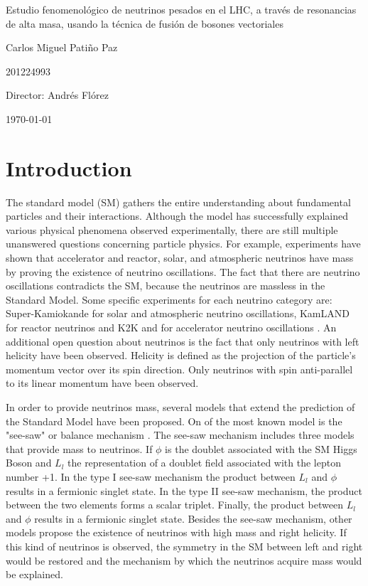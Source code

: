 \documentclass[12pt]{article}
\begin{document}
\begin{center}
\Huge
Estudio fenomenológico de neutrinos pesados en el LHC, a través de resonancias de alta masa, usando la técnica de fusión de bosones vectoriales 

\vspace{3mm}
\Large Carlos Miguel Patiño Paz

\large
201224993


\vspace{2mm}
\Large
Director: Andrés Flórez

\normalsize
\vspace{2mm}

\today
\end{center}


\normalsize
\section{Introduction}

The standard model (SM) gathers the entire understanding about fundamental particles and their interactions. Although the model has successfully explained various physical phenomena observed experimentally, there are still multiple unanswered questions concerning particle physics. For example, experiments \cite{Detectores} have shown that accelerator and reactor, solar, and atmospheric neutrinos have mass by proving the existence of neutrino oscillations. The fact that there are neutrino oscillations contradicts the SM, because the neutrinos are massless in the Standard Model. Some specific experiments for each neutrino category are: Super-Kamiokande \cite{Super-Kamiokande} for solar and atmospheric neutrino oscillations, KamLAND \cite{KamLAND} for reactor neutrinos and K2K \cite{K2K} and for accelerator neutrino oscillations \cite{Experimentos}. An additional open question about neutrinos is the fact that only neutrinos with left helicity have been observed. Helicity is defined as the projection of the particle's momentum vector over its spin direction. Only neutrinos with spin anti-parallel to its linear momentum have been observed.

In order to provide neutrinos mass, several models that extend the prediction of the Standard Model have been proposed. On of the most known model is the "see-saw" or balance mechanism \cite{See-saw}. The see-saw mechanism includes three models that provide mass to neutrinos. If $\phi$ is the doublet associated with the SM Higgs Boson and $L_{l}$ the representation of a doublet field associated with the lepton number +1. In the type I see-saw mechanism the product between $L_{l}$ and $\phi$ results in a fermionic singlet state. In the type II see-saw mechanism, the product between the two elements forms a scalar triplet. Finally, the product between $L_{l}$ and $\phi$ results in a fermionic singlet state. Besides the see-saw mechanism, other models propose the existence of neutrinos with high mass and right helicity. If this kind of neutrinos is observed, the symmetry in the SM between left and right would be restored and the mechanism by which the neutrinos acquire mass would be explained. 
\end{document}

